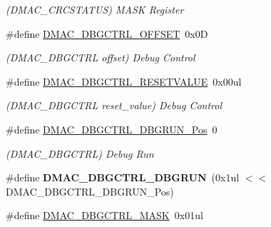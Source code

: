 \begin{DoxyCompactItemize}
\begin{DoxyCompactList}\small\item\em (D\+M\+A\+C\+\_\+\+C\+R\+C\+S\+T\+A\+T\+U\+S) M\+A\+S\+K Register \end{DoxyCompactList}\item 
\hypertarget{group___s_a_m_l21___d_m_a_c_gaa6195ee27516b7db90e1b93d31cf9a23}{}\#define \hyperlink{group___s_a_m_l21___d_m_a_c_gaa6195ee27516b7db90e1b93d31cf9a23}{D\+M\+A\+C\+\_\+\+D\+B\+G\+C\+T\+R\+L\+\_\+\+O\+F\+F\+S\+E\+T}~0x0\+D\label{group___s_a_m_l21___d_m_a_c_gaa6195ee27516b7db90e1b93d31cf9a23}

\begin{DoxyCompactList}\small\item\em (D\+M\+A\+C\+\_\+\+D\+B\+G\+C\+T\+R\+L offset) Debug Control \end{DoxyCompactList}\item 
\hypertarget{group___s_a_m_l21___d_m_a_c_ga3b59d85944712c553bac77eedc9706fa}{}\#define \hyperlink{group___s_a_m_l21___d_m_a_c_ga3b59d85944712c553bac77eedc9706fa}{D\+M\+A\+C\+\_\+\+D\+B\+G\+C\+T\+R\+L\+\_\+\+R\+E\+S\+E\+T\+V\+A\+L\+U\+E}~0x00ul\label{group___s_a_m_l21___d_m_a_c_ga3b59d85944712c553bac77eedc9706fa}

\begin{DoxyCompactList}\small\item\em (D\+M\+A\+C\+\_\+\+D\+B\+G\+C\+T\+R\+L reset\+\_\+value) Debug Control \end{DoxyCompactList}\item 
\hypertarget{group___s_a_m_l21___d_m_a_c_ga8deb5cb9d4ad93002435af93a05f412d}{}\#define \hyperlink{group___s_a_m_l21___d_m_a_c_ga8deb5cb9d4ad93002435af93a05f412d}{D\+M\+A\+C\+\_\+\+D\+B\+G\+C\+T\+R\+L\+\_\+\+D\+B\+G\+R\+U\+N\+\_\+\+Pos}~0\label{group___s_a_m_l21___d_m_a_c_ga8deb5cb9d4ad93002435af93a05f412d}

\begin{DoxyCompactList}\small\item\em (D\+M\+A\+C\+\_\+\+D\+B\+G\+C\+T\+R\+L) Debug Run \end{DoxyCompactList}\item 
\hypertarget{group___s_a_m_l21___d_m_a_c_ga82ff63971593b5b403b90676eae6034d}{}\#define {\bfseries D\+M\+A\+C\+\_\+\+D\+B\+G\+C\+T\+R\+L\+\_\+\+D\+B\+G\+R\+U\+N}~(0x1ul $<$$<$ D\+M\+A\+C\+\_\+\+D\+B\+G\+C\+T\+R\+L\+\_\+\+D\+B\+G\+R\+U\+N\+\_\+\+Pos)\label{group___s_a_m_l21___d_m_a_c_ga82ff63971593b5b403b90676eae6034d}

\item 
\hypertarget{group___s_a_m_l21___d_m_a_c_ga568ad642de4d4fec94470304cbd0cb04}{}\#define \hyperlink{group___s_a_m_l21___d_m_a_c_ga568ad642de4d4fec94470304cbd0cb04}{D\+M\+A\+C\+\_\+\+D\+B\+G\+C\+T\+R\+L\+\_\+\+M\+A\+S\+K}~0x01ul\label{group___s_a_m_l21___d_m_a_c_ga568ad642de4d4fec94470304cbd0cb04}


\end{DoxyCompactItemize}
